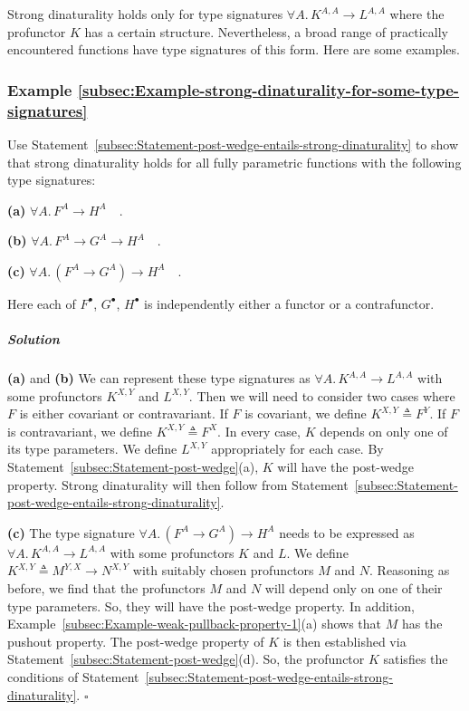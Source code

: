 Strong dinaturality holds only for type signatures $\forall A.\,K^{A,A}\rightarrow L^{A,A}$
where the profunctor $K$ has a certain structure. Nevertheless, a
broad range of practically encountered functions have type signatures
of this form. Here are some examples.

\subsubsection{Example \label{subsec:Example-strong-dinaturality-for-some-type-signatures}\ref{subsec:Example-strong-dinaturality-for-some-type-signatures}}

Use Statement~\ref{subsec:Statement-post-wedge-entails-strong-dinaturality}
to show that strong dinaturality holds for all fully parametric functions
with the following type signatures:

\textbf{(a)} $\forall A.\,F^{A}\rightarrow H^{A}\quad.$

\textbf{(b)} $\forall A.\,F^{A}\rightarrow G^{A}\rightarrow H^{A}\quad.$

\textbf{(c)} $\forall A.\,(F^{A}\rightarrow G^{A})\rightarrow H^{A}\quad.$

Here each of $F^{\bullet}$, $G^{\bullet}$, $H^{\bullet}$ is independently
either a functor or a contrafunctor. 

\subparagraph{Solution}

\textbf{(a)} and \textbf{(b)} We can represent these type signatures
as $\forall A.\,K^{A,A}\rightarrow L^{A,A}$ with some profunctors
$K^{X,Y}$ and $L^{X,Y}$. Then we will need to consider two cases
where $F$ is either covariant or contravariant. If $F$ is covariant,
we define $K^{X,Y}\triangleq F^{Y}$. If $F$ is contravariant, we
define $K^{X,Y}\triangleq F^{X}$. In every case, $K$ depends on
only one of its type parameters. We define $L^{X,Y}$ appropriately
for each case. By Statement~\ref{subsec:Statement-post-wedge}(a),
$K$ will have the post-wedge property. Strong dinaturality will then
follow from Statement~\ref{subsec:Statement-post-wedge-entails-strong-dinaturality}.

\textbf{(c)} The type signature $\forall A.\,(F^{A}\rightarrow G^{A})\rightarrow H^{A}$
needs to be expressed as $\forall A.\,K^{A,A}\rightarrow L^{A,A}$
with some profunctors $K$ and $L$. We define $K^{X,Y}\triangleq M^{Y,X}\rightarrow N^{X,Y}$
with suitably chosen profunctors $M$ and $N$. Reasoning as before,
we find that the profunctors $M$ and $N$ will depend only on one
of their type parameters. So, they will have the post-wedge property.
In addition, Example~\ref{subsec:Example-weak-pullback-property-1}(a)
shows that $M$ has the pushout property. The post-wedge property
of $K$ is then established via Statement~\ref{subsec:Statement-post-wedge}(d).
So, the profunctor $K$ satisfies the conditions of Statement~\ref{subsec:Statement-post-wedge-entails-strong-dinaturality}.
$\square$

